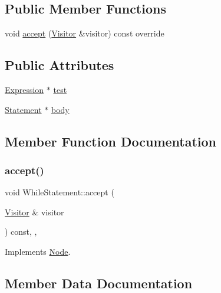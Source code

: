 \subsection*{Public Member Functions}
\begin{DoxyCompactItemize}
\item 
void \hyperlink{struct_while_statement_a017a8824abdcb5551061dae2a09e8ead}{accept} (\hyperlink{struct_visitor}{Visitor} \&visitor) const override
\end{DoxyCompactItemize}
\subsection*{Public Attributes}
\begin{DoxyCompactItemize}
\item 
\hyperlink{struct_expression}{Expression} $\ast$ \hyperlink{struct_while_statement_acfede7e3d617c685032f657a7a95aa15}{test}
\item 
\hyperlink{struct_statement}{Statement} $\ast$ \hyperlink{struct_while_statement_adcb2abe56520e643ad7b1192099c75e6}{body}
\end{DoxyCompactItemize}


\subsection{Member Function Documentation}
\mbox{\label{struct_while_statement_a017a8824abdcb5551061dae2a09e8ead}} 
\subsubsection{\texorpdfstring{accept()}{accept()}}
{\footnotesize\ttfamily void While\+Statement\+::accept (\begin{DoxyParamCaption}\item[{\hyperlink{struct_visitor}{Visitor} \&}]{visitor }\end{DoxyParamCaption}) const\hspace{0.3cm}{\ttfamily [inline]}, {\ttfamily [override]}, {\ttfamily [virtual]}}



Implements \hyperlink{struct_node_a10bd7af968140bbf5fa461298a969c71}{Node}.



\subsection{Member Data Documentation}
\mbox{\label{struct_while_statement_adcb2abe56520e643ad7b1192099c75e6}} 

